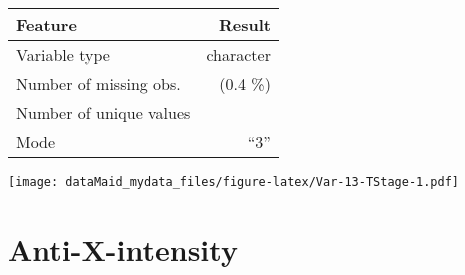 \documentclass[]{report}
\begin{document}
\begin{minipage}{0.75 \textwidth}

\begin{longtable}[]{@{}lr@{}}
\toprule
\begin{minipage}[b]{0.34\columnwidth}\raggedright
Feature\strut
\end{minipage} & \begin{minipage}[b]{0.16\columnwidth}\raggedleft
Result\strut
\end{minipage}\tabularnewline
\midrule
\endhead
\begin{minipage}[t]{0.34\columnwidth}\raggedright
Variable type\strut
\end{minipage} & \begin{minipage}[t]{0.16\columnwidth}\raggedleft
character\strut
\end{minipage}\tabularnewline
\begin{minipage}[t]{0.34\columnwidth}\raggedright
Number of missing obs.\strut
\end{minipage} & \begin{minipage}[t]{0.16\columnwidth}\raggedleft
1 (0.4 \%)\strut
\end{minipage}\tabularnewline
\begin{minipage}[t]{0.34\columnwidth}\raggedright
Number of unique values\strut
\end{minipage} & \begin{minipage}[t]{0.16\columnwidth}\raggedleft
4\strut
\end{minipage}\tabularnewline
\begin{minipage}[t]{0.34\columnwidth}\raggedright
Mode\strut
\end{minipage} & \begin{minipage}[t]{0.16\columnwidth}\raggedleft
``3''\strut
\end{minipage}\tabularnewline
\bottomrule
\end{longtable}

\end{minipage}
\begin{minipage}{0.25 \textwidth}

\texttt{[image: dataMaid\_mydata\_files/figure-latex/Var-13-TStage-1.pdf]}

\end{minipage}

\noindent\makebox[\linewidth]{\rule{\textwidth}{0.4pt}}

\hypertarget{anti-x-intensity}{%
\section{Anti-X-intensity}\label{anti-x-intensity}}
\end{document}
